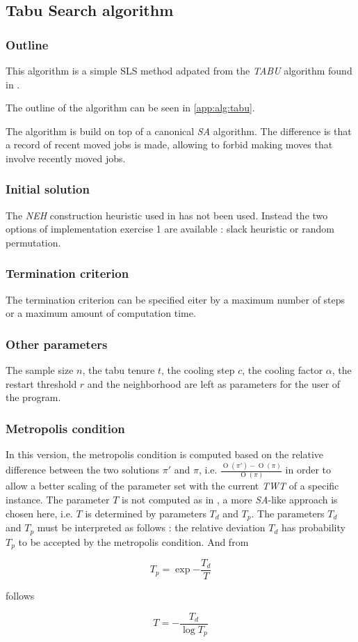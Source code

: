 \subsection{Tabu Search algorithm}
\label{impl:tabu}

\subsubsection{Outline}

This algorithm is a simple SLS method adpated from the \emph{TABU} algorithm found in \cite{santostabu}.

The outline of the algorithm can be seen in \ref{app:alg:tabu}.

The algorithm is build on top of a canonical \emph{SA} algorithm. The difference is that a record of recent moved jobs is made, allowing to forbid making moves that involve recently moved jobs.

\subsubsection{Initial solution}

The \emph{NEH} construction heuristic used in \cite{santostabu} has not been used. Instead the two options of implementation exercise 1 are available : slack heuristic or random permutation.


\subsubsection{Termination criterion}

The termination criterion can be specified eiter by a maximum number of steps or a maximum amount of computation time.


\subsubsection{Other parameters}

The sample size $n$, the tabu tenure $t$, the cooling step $c$, the cooling factor $\alpha$, the restart threshold $r$ and the neighborhood are left as parameters for the user of the program.

\subsubsection{Metropolis condition}
\label{impl:tabu:metropolis}

In this version, the metropolis condition is computed based on the relative difference between the two solutions $\pi'$ and $\pi$, i.e. $\frac{\operatorname{O}(\pi') - \operatorname{O}(\pi)}{\operatorname{O}(\pi)}$ in order to allow a better scaling of the parameter set with the current \emph{TWT} of a specific instance. The parameter $T$ is not computed as in \cite{DBLP:journals/eor/RuizS08}, a more \emph{SA}-like approach is chosen here, i.e. $T$ is determined by parameters $T_d$ and $T_p$. The parameters $T_d$ and $T_p$ must be interpreted as follows : the relative deviation $T_d$ has probability $T_p$ to be accepted by the metropolis condition. And from

$$ T_p = \exp{-\frac{T_d}{T}} $$

follows

$$ T = - \frac{T_d}{\log{T_p}} $$